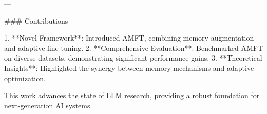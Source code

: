 ---

### Contributions

1. **Novel Framework**: Introduced AMFT, combining memory augmentation and adaptive fine-tuning.
2. **Comprehensive Evaluation**: Benchmarked AMFT on diverse datasets, demonstrating significant performance gains.
3. **Theoretical Insights**: Highlighted the synergy between memory mechanisms and adaptive optimization.

This work advances the state of LLM research, providing a robust foundation for next-generation AI systems.